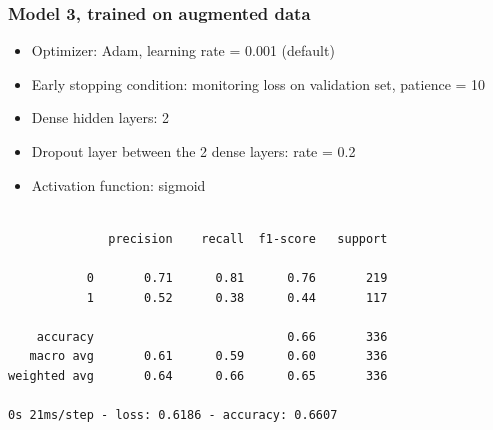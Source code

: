 \documentclass{article}
\begin{document}
\subsubsection{Model 3, trained on augmented data}

\begin{itemize}
\item Optimizer: Adam, learning rate = 0.001 (default)
\item Early stopping condition: monitoring loss on validation set, patience = 10
\item Dense hidden layers: 2
\item Dropout layer between the 2 dense layers: rate = 0.2
\item Activation function: sigmoid
\end{itemize}
\begin{verbatim}

              precision    recall  f1-score   support

           0       0.71      0.81      0.76       219
           1       0.52      0.38      0.44       117

    accuracy                           0.66       336
   macro avg       0.61      0.59      0.60       336
weighted avg       0.64      0.66      0.65       336

0s 21ms/step - loss: 0.6186 - accuracy: 0.6607

\end{verbatim}
\end{document}
